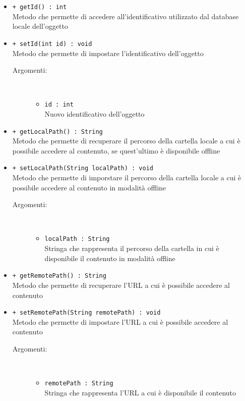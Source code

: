 \documentclass[../Tesi.tex]{subfiles}
\begin{document}
\begin{description}
\begin{itemize}
				\item \texttt{+ getId() : int}\\
				Metodo che permette di accedere all'identificativo utilizzato dal database locale dell'oggetto

				\item \texttt{+ setId(int id) : void}\\
				Metodo che permette di impostare l'identificativo dell'oggetto
				\begin{description}
					\item[Argomenti:] \
					\begin{itemize}
						\item \texttt{id : int}\\
						Nuovo identificativo dell'oggetto
					\end{itemize}
				\end{description}

				\item \texttt{+ getLocalPath() : String}\\
				Metodo che permette di recuperare il percorso della cartella locale a cui è possibile accedere al contenuto, se quest'ultimo è disponibile offline

				\item \texttt{+ setLocalPath(String localPath) : void}\\
				Metodo che permette di imporstare il percorso della cartella locale a cui è possibile accedere al contenuto in modalità offline
				\begin{description}
					\item[Argomenti:] \
					\begin{itemize}
						\item \texttt{localPath : String}\\
						Stringa che rappresenta il percorso della cartella in cui è disponibile il contenuto in modalità offline
					\end{itemize}
				\end{description}

				\item \texttt{+ getRemotePath() : String}\\
				Metodo che permette di recuperare l'URL a cui è possibile accedere al contenuto

				\item \texttt{+ setRemotePath(String remotePath) : void}\\
				Metodo che permette di impostare l'URL a cui è possibile accedere al contenuto
				\begin{description}
					\item[Argomenti:] \
					\begin{itemize}
						\item \texttt{remotePath : String}\\
						Stringa che rappresenta l'URL a cui è disponibile il contenuto
					\end{itemize}
				\end{description}


\end{itemize}
\end{description}
\end{document}
